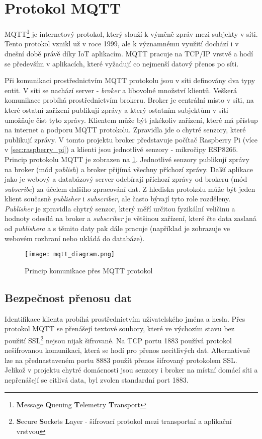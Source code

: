 \section{Protokol MQTT} \label{sec:protocol_mqtt}
MQTT\footnote{\textbf{M}essage \textbf{Q}ueuing \textbf{T}elemetry \textbf{T}ransport} je internetový protokol, který slouží k výměně zpráv mezi subjekty v síti. Tento protokol vznikl už v roce 1999, ale k významnému využití dochází i v dnešní době právě díky IoT aplikacím. MQTT pracuje na TCP/IP vrstvě a hodí se především v aplikacích, které vyžadují co nejmenší datový přenos po síti.  \par
Při komunikaci prostřednictvím MQTT protokolu jsou v síti definovány dva typy entit. V síti se nachází server - \textit{broker} a libovolné množství klientů. Veškerá komunikace probíhá prostřednictvím brokeru. Broker je centrální místo v síti, na které ostatní zařízení publikují zprávy a který ostatním subjektům v síti umožňuje číst tyto zprávy. Klientem může být jakékoliv zařízení, které má přístup na internet a podporu MQTT protokolu. Zpravidla jde o chytré senzory, které publikují zprávy. V tomto projektu broker představuje počítač Raspberry Pi (více v \cref{sec:raspberry_pi}) a klienti jsou jednotlivé senzory - mikročipy ESP8266. Princip protokolu MQTT je zobrazen na \cref{fig:mqtt_communication}. Jednotlivé senzory publikují zprávy na broker (mód \textit{publish}) a broker přijímá všechny příchozí zprávy. Další aplikace jako je webový a databázový server odebírají příchozí zprávy od brokeru (mód \textit{subscribe}) za účelem dalšího zpracování dat. Z hlediska protokolu může být jeden klient současně \textit{publisher} i \textit{subscriber}, ale často bývají tyto role rozděleny. \textit{Publisher} je zpravidla chytrý senzor, který měří určitou fyzikální veličinu a hodnoty odesílá na broker a \textit{subscriber} je většinou zařízení, které čte data zaslaná od \textit{publishera} a s těmito daty pak dále pracuje (například je zobrazuje ve webovém rozhraní nebo ukládá do databáze).  

\begin{figure}[H]
  \centering
  \texttt{[image: mqtt\_diagram.png]}
  \caption{Princip komunikace přes MQTT protokol}
  \label{fig:mqtt_communication}
\end{figure}

\subsection*{Bezpečnost přenosu dat}
Identifikace klienta probíhá prostřednictvím uživatelského jména a hesla. Přes protokol MQTT se přenášejí textové soubory, které ve výchozím stavu bez použití SSL\footnote{\textbf{S}ecure \textbf{S}ockets \textbf{L}ayer - šifrovací protokol mezi transportní a aplikační vrstvou} nejsou nijak šifrované. Na TCP portu 1883 používá protokol nešifrovanou komunikaci, která se hodí pro přenos necitlivých dat. Alternativně lze na přednastaveném portu 8883 použít přenos šifrovaný protokolem SSL. Jelikož v projektu chytré domácnosti jsou senzory i broker na místní domácí síti a nepřenášejí se citlivá data, byl zvolen standardní port 1883.

